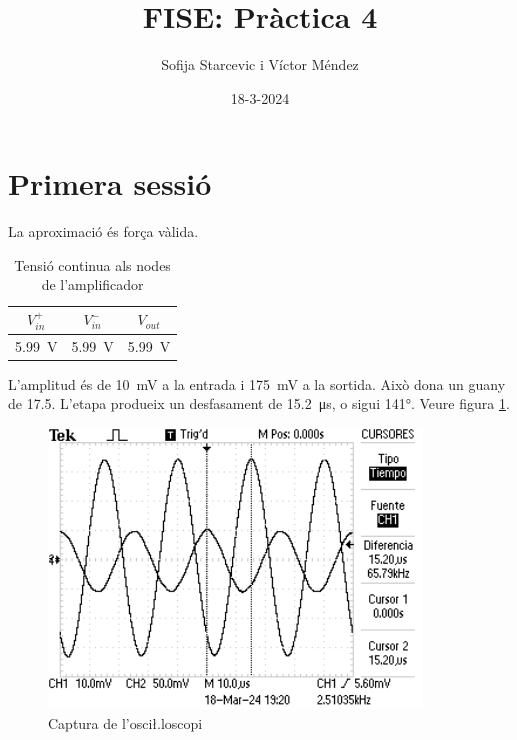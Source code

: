 \documentclass[catalan, a4paper, nobib]{tufte-handout}
\author{Sofija Starcevic i Víctor Méndez}
\title{FISE: Pràctica 4}
\date{18-3-2024}
\begin{document}
\maketitle

\part{Primera sessió}

 La aproximació és força vàlida.

\begin{table}[h]
  \begin{center}
    \begin{tabular}{@{}ccc@{}}
      \toprule
      $V_{in}^+$ & $V_{in}^-$ & $V_{out}$ \\
      \midrule
      \qty{5.99}{\volt} & \qty{5.99}{\volt} & \qty{5.99}{\volt} \\
      \bottomrule
    \end{tabular}
  \end{center}
  \caption{Tensió continua als nodes de l'amplificador}
  \label{tab:t1}
\end{table}

 L'amplitud és de \qty{10}{\milli\volt} a la entrada i \qty{175}{\milli\volt} a la sortida. Això dona un guany de \num{17.5}. L'etapa produeix un desfasament de \qty{15.2}{\micro\second}, o sigui \ang{141}. Veure figura \ref{fig:f1}.

\vspace{30px}

\begin{figure}[h]
  \begin{center}
    \includegraphics[width=375px]{s1_cap.png}
  \end{center}
  \caption{Captura de l'osci\l.loscopi}
  \label{fig:f1}
\end{figure}
\end{document}
